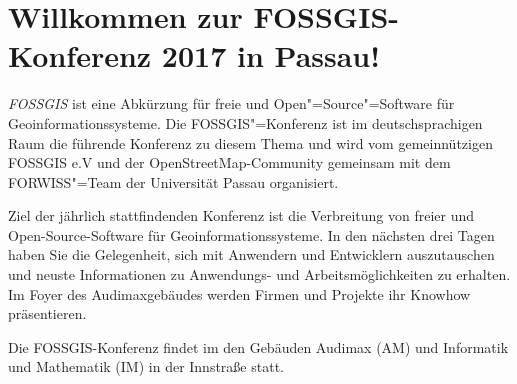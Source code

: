 \newpage
\section*{Willkommen zur FOSSGIS-Konferenz 2017 in Passau!} \label{welcome}
\emph{FOSSGIS} ist eine Abkürzung für freie und Open"=Source"=Software für Geoinformationssysteme.
Die FOSSGIS"=Konferenz ist im deutschsprachigen Raum die führende Konferenz zu diesem Thema
und wird vom gemeinnützigen FOSSGIS e.V und der OpenStreetMap-Community
gemeinsam mit dem FORWISS"=Team der Universität Passau organisiert.

Ziel der jährlich stattfindenden Konferenz ist die Verbreitung von freier und
Open-Source-Software für Geoinformationssysteme.  In den nächsten drei Tagen
haben Sie die Gelegenheit, sich mit Anwendern und Entwicklern auszutauschen und
neuste Informationen zu Anwendungs- und Arbeitsmöglichkeiten zu erhalten. Im
Foyer des Audimaxgebäudes werden Firmen und Projekte ihr Knowhow präsentieren.

Die FOSSGIS-Konferenz findet im den Gebäuden Audimax (AM) und Informatik und
Mathematik (IM) in der Innstraße statt.

\newpage

